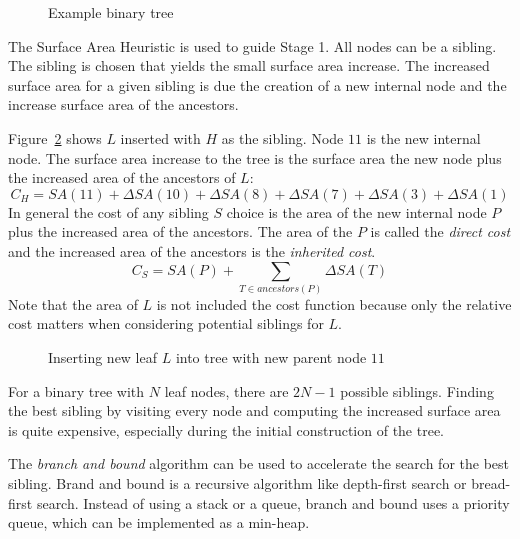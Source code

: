 \documentclass{article}
\begin{document}
\begin{figure}
	\begin{center}
		
	\end{center}
	\caption{Example binary tree}
	\label{fig:example_tree}
\end{figure}

The Surface Area Heuristic is used to guide Stage 1. All nodes can be a sibling. The sibling is chosen that yields the small surface area increase. The increased surface area for a given sibling is due the creation of a new internal node and the increase surface area of the ancestors.

Figure~\ref{fig:insert_leaf} shows $L$ inserted with $H$ as the sibling. Node $11$ is the new internal node. The surface area increase to the tree is the surface area the new node plus the increased area of the ancestors of $L$:
\begin{equation}
	C_H = SA(11) + \Delta SA(10) + \Delta SA(8) + \Delta SA(7) + \Delta SA(3) + \Delta SA(1)
\end{equation}
In general the cost of any sibling $S$ choice is the area of the new internal node $P$ plus the increased area of the ancestors. The area of the $P$ is called the \emph{direct cost} and the increased area of the ancestors is the \emph{inherited cost}.
\[ C_S = SA(P) + \sum_{T \in ancestors(P)} \Delta SA(T) \]
Note that the area of $L$ is not included the cost function because only the relative cost matters when considering potential siblings for $L$.

\begin{figure}
	\begin{center}
		
	\end{center}
	\caption{Inserting new leaf $L$ into tree with new parent node $11$}
	\label{fig:insert_leaf}
\end{figure}

For a binary tree with $N$ leaf nodes, there are $2N - 1$ possible siblings. Finding the best sibling by visiting every node and computing the increased surface area is quite expensive, especially during the initial construction of the tree.

The \emph{branch and bound} algorithm can be used to accelerate the search for the best sibling. Brand and bound is a recursive algorithm like depth-first search or bread-first search. Instead of using a stack or a queue, branch and bound uses a priority queue, which can be implemented as a min-heap.
\end{document}
